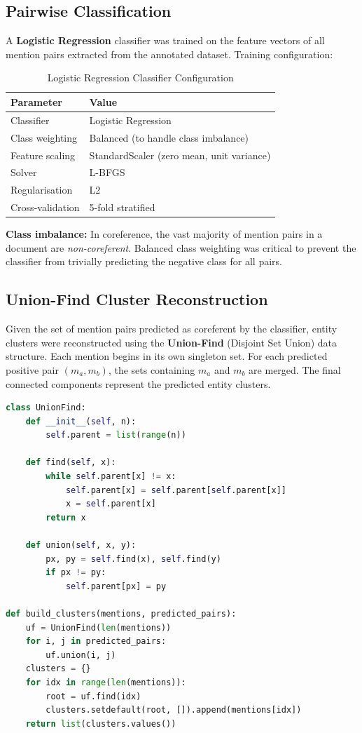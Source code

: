 \documentclass[12pt,a4paper]{report}
\begin{document}
\subsection{Pairwise Classification}

A \textbf{Logistic Regression} classifier was trained on the feature vectors of all mention pairs extracted from the annotated dataset. Training configuration:

\begin{table}[H]
\centering
\caption{Logistic Regression Classifier Configuration}
\begin{tabular}{|l|l|}
\hline
\textbf{Parameter} & \textbf{Value} \\
\hline
Classifier & Logistic Regression \\
Class weighting & Balanced (to handle class imbalance) \\
Feature scaling & StandardScaler (zero mean, unit variance) \\
Solver & L-BFGS \\
Regularisation & L2 \\
Cross-validation & 5-fold stratified \\
\hline
\end{tabular}
\end{table}

\noindent \textbf{Class imbalance:} In coreference, the vast majority of mention pairs in a document are \textit{non-coreferent}. Balanced class weighting was critical to prevent the classifier from trivially predicting the negative class for all pairs.

\subsection{Union-Find Cluster Reconstruction}

Given the set of mention pairs predicted as coreferent by the classifier, entity clusters were reconstructed using the \textbf{Union-Find} (Disjoint Set Union) data structure. Each mention begins in its own singleton set. For each predicted positive pair $(m_a, m_b)$, the sets containing $m_a$ and $m_b$ are merged. The final connected components represent the predicted entity clusters.

\begin{lstlisting}[language=Python, caption={Union-Find Cluster Reconstruction}]
class UnionFind:
    def __init__(self, n):
        self.parent = list(range(n))

    def find(self, x):
        while self.parent[x] != x:
            self.parent[x] = self.parent[self.parent[x]]
            x = self.parent[x]
        return x

    def union(self, x, y):
        px, py = self.find(x), self.find(y)
        if px != py:
            self.parent[px] = py

def build_clusters(mentions, predicted_pairs):
    uf = UnionFind(len(mentions))
    for i, j in predicted_pairs:
        uf.union(i, j)
    clusters = {}
    for idx in range(len(mentions)):
        root = uf.find(idx)
        clusters.setdefault(root, []).append(mentions[idx])
    return list(clusters.values())
\end{lstlisting}
\end{document}
